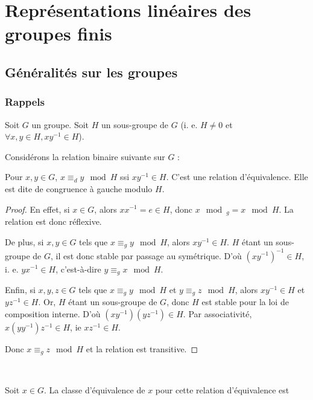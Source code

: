 \documentclass[french]{book}
\title{\bsc{Théorie des représentations}}
\date{2023-2024}
\author{Yves \bsc{Aubry}, M-147A, yves.aubry@univ-tln.fr, Joachim \bsc{Asch}}
\theoremstyle{definition}
\theoremstyle{remark}
\begin{document}
\maketitle

\tableofcontents

\part{Représentations linéaires des groupes finis}

\chapter{Généralités sur les groupes}

\section{Rappels}


Soit $G$ un groupe. Soit $H$ un sous-groupe de $G$ (i. e. $H \neq 0$ et $\forall x, y \in H, x y ^{-1} \in H$).

Considérons la relation binaire suivante sur $G$ :

Pour $x, y \in G$, $x \equiv _{d} y \mod H$ ssi $x y ^{-1} \in H$. C'est une relation d'équivalence. Elle est dite de congruence à gauche modulo $H$.

\begin{proof}
  En effet, si $x \in G$, alors $x x ^{-1} = e \in H$, donc $x \mod _{g} = x \mod H$. La relation est donc réflexive.

  De plus, si $x, y \in G$ tels que $x \equiv _{g} y \mod H$, alors $x y ^{-1} \in H$. $H$ étant un sous-groupe de $G$, il est donc stable par passage au symétrique. D'où $(x y ^{-1} ) ^{-1}  \in H$, i. e. $y x ^{-1} \in H$, c'est-à-dire $y \equiv _{g} x \mod H$.

  Enfin, si $x, y,z \in G$ tels que $x \equiv _{g} y \mod H$ et $y \equiv _{g} z \mod H$, alors $x y ^{-1} \in H$ et $yz ^{-1} \in H$. Or, $H$ étant un sous-groupe de $G$, donc $H$ est stable pour la loi de composition interne. D'où $(x y ^{-1} )(y z ^{-1} ) \in H$. Par associativité, $x (y y ^{-1} ) z ^{-1}  \in H$, ie $x z ^{-1}  \in H$.

  Donc $x \equiv _{g} z \mod H $ et la relation est transitive.
\end{proof}

\

Soit $x \in G$. La classe d'équivalence de $x$ pour cette relation d'équivalence est
\end{document}
